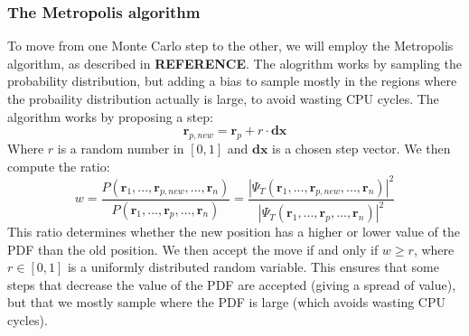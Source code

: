 \documentclass[a4paper, 10pt]{article}
\begin{document}
	\subsubsection{The Metropolis algorithm}
	To move from one Monte Carlo step to the other, we will employ the Metropolis algorithm, as described in \textbf{REFERENCE}. The alogrithm works by sampling the probability distribution, but adding a bias to sample mostly in the regions where the probaility distribution actually is large, to avoid wasting CPU cycles. The algorithm works by proposing a step:
	\begin{equation}
	\boldsymbol{r}_{p, new}=\boldsymbol{r}_p+r \cdot \boldsymbol{dx}
	\end{equation}
	Where $r$ is a random number in $[0,1]$ and $\boldsymbol{dx}$ is a chosen step vector. We then compute the ratio:
	\begin{equation}
	w=\frac{P(\boldsymbol{r}_1, ..., \boldsymbol{r}_{p,new}, ..., \boldsymbol{r}_n)}{P(\boldsymbol{r}_1, ..., \boldsymbol{r}_{p}, ..., \boldsymbol{r}_n)}=\frac{|\Psi_T(\boldsymbol{r}_1, ..., \boldsymbol{r}_{p,new}, ..., \boldsymbol{r}_n)|^2}{|\Psi_T(\boldsymbol{r}_1, ..., \boldsymbol{r}_{p}, ..., \boldsymbol{r}_n)|^2}
	\end{equation}
	This ratio determines whether the new position has a higher or lower value of the PDF than the old position. We then accept the move if and only if $w\geq r$, where $r\in [0,1]$ is a uniformly distributed random variable. This ensures that some steps that decrease the value of the PDF are accepted (giving a spread of value), but that we mostly sample where the PDF is large (which avoids wasting CPU cycles).
\end{document}
